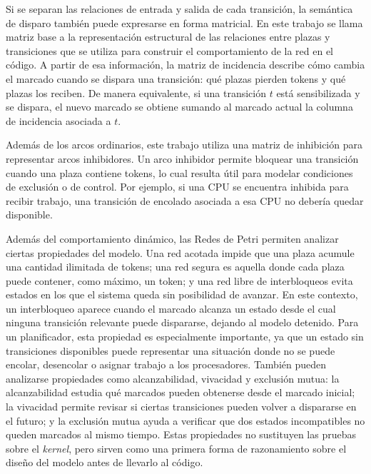 Si se separan las relaciones de entrada y salida de cada transición, la semántica de disparo también puede expresarse en forma matricial. En este trabajo se llama matriz base a la representación estructural de las relaciones entre plazas y transiciones que se utiliza para construir el comportamiento de la red en el código. A partir de esa información, la matriz de incidencia describe cómo cambia el marcado cuando se dispara una transición: qué plazas pierden tokens y qué plazas los reciben. De manera equivalente, si una transición \(t\) está sensibilizada y se dispara, el nuevo marcado se obtiene sumando al marcado actual la columna de incidencia asociada a \(t\).\par

Además de los arcos ordinarios, este trabajo utiliza una matriz de inhibición para representar arcos inhibidores. Un arco inhibidor permite bloquear una transición cuando una plaza contiene tokens, lo cual resulta útil para modelar condiciones de exclusión o de control\cite{bib7}. Por ejemplo, si una CPU se encuentra inhibida para recibir trabajo, una transición de encolado asociada a esa CPU no debería quedar disponible.\par

Además del comportamiento dinámico, las Redes de Petri permiten analizar ciertas propiedades del modelo. Una red acotada impide que una plaza acumule una cantidad ilimitada de tokens; una red segura es aquella donde cada plaza puede contener, como máximo, un token; y una red libre de interbloqueos evita estados en los que el sistema queda sin posibilidad de avanzar. En este contexto, un interbloqueo aparece cuando el marcado alcanza un estado desde el cual ninguna transición relevante puede dispararse, dejando al modelo detenido. Para un planificador, esta propiedad es especialmente importante, ya que un estado sin transiciones disponibles puede representar una situación donde no se puede encolar, desencolar o asignar trabajo a los procesadores. También pueden analizarse propiedades como alcanzabilidad, vivacidad y exclusión mutua: la alcanzabilidad estudia qué marcados pueden obtenerse desde el marcado inicial; la vivacidad permite revisar si ciertas transiciones pueden volver a dispararse en el futuro; y la exclusión mutua ayuda a verificar que dos estados incompatibles no queden marcados al mismo tiempo. Estas propiedades no sustituyen las pruebas sobre el \textit{kernel}, pero sirven como una primera forma de razonamiento sobre el diseño del modelo antes de llevarlo al código\cite{bib7}.\par

